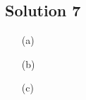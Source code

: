 \subsection*{Solution 7}

\begin{itemize}
\item[(a)]
\todo
\item[(b)]
\todo
\item[(c)]
\todo
\end{itemize}

